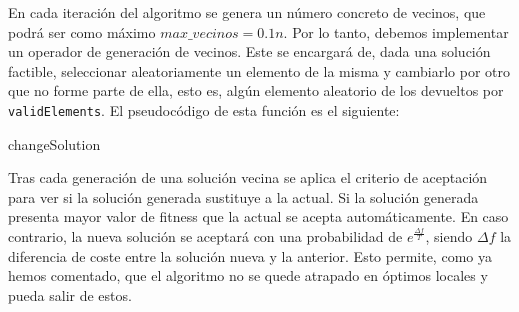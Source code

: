 \documentclass[11pt,a4paper]{article}
\begin{document}
En cada iteración del algoritmo se genera un número concreto de vecinos, que podrá ser como máximo $max\_vecinos=0.1n$. Por lo tanto, debemos implementar un operador de generación de vecinos. Este se encargará de, dada una solución factible, seleccionar aleatoriamente un elemento de la misma y cambiarlo por otro  que no forme parte de ella, esto es, algún elemento aleatorio de los devueltos por \lstinline|validElements|. El pseudocódigo de esta función es el siguiente: 
\begin{algorithm}[H]
	\DontPrintSemicolon
	\caption{\sc changeSolution}
\end{algorithm}

Tras cada generación de una solución vecina se aplica el criterio de aceptación para ver si la solución generada sustituye a la actual. Si la solución generada presenta mayor valor de fitness que la actual se acepta automáticamente. En caso contrario, la nueva solución se aceptará con una probabilidad de $e^{\frac{\Delta f}{T}}$, siendo $\Delta f$ la diferencia de coste entre la solución nueva y la anterior. Esto permite, como ya hemos comentado, que el algoritmo no se quede atrapado en óptimos locales y pueda salir de estos. 
\end{document}
